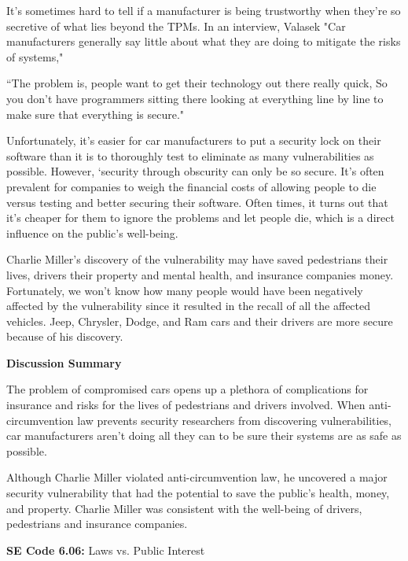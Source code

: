 \documentclass[12pt]{article}
\begin{document}
\begin{multicols}{2}
It's sometimes hard to tell if a manufacturer is being trustworthy when they're so secretive of what lies beyond the TPMs. In an interview, Valasek "Car manufacturers generally say little about what they are doing to mitigate the risks of systems,"\cite{hackingRisk}

``The problem is, people want to get their technology out there really quick, So you don’t have programmers sitting there looking at everything line by line to make sure that everything is secure."\cite{insuranceRisks}

Unfortunately, it's easier for car manufacturers to put a security lock on their software than it is to thoroughly test to eliminate as many vulnerabilities as possible. \cite{chris} However, `security through obscurity can only be so secure.\cite{chris} It's often prevalent for companies to weigh the financial costs of allowing people to die versus testing and better securing their software. \cite{turner} Often times, it turns out that it's cheaper for them to ignore the problems and let people die, which is a direct influence on the public's well-being. \cite{turner}

Charlie Miller's discovery of the vulnerability may have saved pedestrians their lives, drivers their property and mental health, and insurance companies money. Fortunately, we won't know how many people would have been negatively affected by the vulnerability since it resulted in the recall of all the affected vehicles. \cite{recall} Jeep, Chrysler, Dodge, and Ram cars and their drivers are more secure because of his discovery. \cite{recall}

\vspace{.5cm}\hspace{-.5cm}\textbf{Discussion Summary}\vspace{.2cm}

The problem of compromised cars opens up a plethora of complications for insurance and risks for the lives of pedestrians and drivers involved. When anti-circumvention law prevents security researchers from discovering vulnerabilities, car manufacturers aren't doing all they can to be sure their systems are as safe as possible. 

Although Charlie Miller violated anti-circumvention law, he uncovered a major security vulnerability that had the potential to save the public's health, money, and property. Charlie Miller was consistent with the well-being of drivers, pedestrians and insurance companies.

\begin{framed}
\hspace{-.67cm}\textbf{SE Code 6.06:} Laws vs. Public Interest


\end{framed}
\end{multicols}
\end{document}
